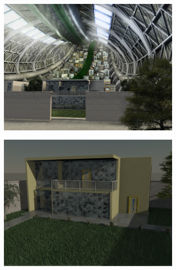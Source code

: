 \documentclass[11pt,a4paper]{article}
\begin{document}
\begin{figure}[H]
 \begin{subfigure}{0.32\textwidth}
 \centering
  \includegraphics[width=\textwidth]{images/interior-final-nocharacters}
 \end{subfigure}
 \begin{subfigure}{0.32\textwidth}
 \centering
  \includegraphics[width=\textwidth]{images/house2}
 \end{subfigure}
  \begin{subfigure}{0.32\textwidth}
 \centering

\end{subfigure}
\end{figure}
\end{document}
